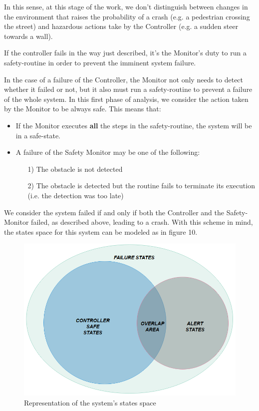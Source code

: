 In this sense, at this stage of the work, we don't distinguish between changes in the environment that raises the probability of a crash (e.g. a pedestrian crossing the street) and hazardous actions take by the Controller (e.g. a sudden steer towards a wall).

If the controller fails in the way just described, it's the Monitor's duty to run a safety-routine in order to prevent the imminent system failure.\newline

In the case of a failure of the Controller, the Monitor not only needs to detect whether it failed or not, but it also must run a safety-routine to prevent a failure of the whole system. In this first phase of analysis, we consider the action taken by the Monitor to be always safe. This means that:

\begin{itemize}
	\item If the Monitor executes \textbf{all} the steps in the safety-routine, the system will be in a safe-state.
	\item A failure of the Safety Monitor may be one of the following:
	\begin{itemize}
		\item[1)] The obstacle is not detected
		\item[2)] The obstacle is detected but the routine fails to terminate its execution (i.e. the detection was too late)
	\end{itemize}
\end{itemize}

We consider the system failed if and only if both the Controller and the Safety-Monitor failed, as described above, leading to a crash.
With this scheme in mind, the states space for this system can be modeled as in figure 10.\newline

\begin{figure}[h!]
	\includegraphics[width=\textwidth]{img/state-space-true.png}
	\caption{Representation of the system's states space}
\end{figure}

